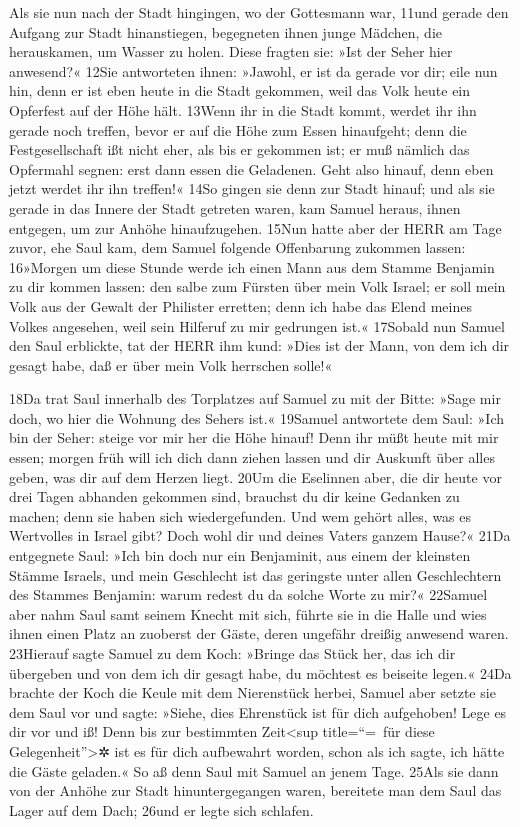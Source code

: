 Als sie nun nach der Stadt hingingen, wo der Gottesmann war, 11und
gerade den Aufgang zur Stadt hinanstiegen, begegneten ihnen junge
Mädchen, die herauskamen, um Wasser zu holen. Diese fragten sie: »Ist
der Seher hier anwesend?« 12Sie antworteten ihnen: »Jawohl, er ist da
gerade vor dir; eile nun hin, denn er ist eben heute in die Stadt
gekommen, weil das Volk heute ein Opferfest auf der Höhe hält. 13Wenn
ihr in die Stadt kommt, werdet ihr ihn gerade noch treffen, bevor er auf
die Höhe zum Essen hinaufgeht; denn die Festgesellschaft ißt nicht eher,
als bis er gekommen ist; er muß nämlich das Opfermahl segnen: erst dann
essen die Geladenen. Geht also hinauf, denn eben jetzt werdet ihr ihn
treffen!« 14So gingen sie denn zur Stadt hinauf; und als sie gerade in
das Innere der Stadt getreten waren, kam Samuel heraus, ihnen entgegen,
um zur Anhöhe hinaufzugehen. 15Nun hatte aber der HERR am Tage zuvor,
ehe Saul kam, dem Samuel folgende Offenbarung zukommen lassen: 16»Morgen
um diese Stunde werde ich einen Mann aus dem Stamme Benjamin zu dir
kommen lassen: den salbe zum Fürsten über mein Volk Israel; er soll mein
Volk aus der Gewalt der Philister erretten; denn ich habe das Elend
meines Volkes angesehen, weil sein Hilferuf zu mir gedrungen ist.«
17Sobald nun Samuel den Saul erblickte, tat der HERR ihm kund: »Dies ist
der Mann, von dem ich dir gesagt habe, daß er über mein Volk herrschen
solle!«

18Da trat Saul innerhalb des Torplatzes auf Samuel zu mit der Bitte:
»Sage mir doch, wo hier die Wohnung des Sehers ist.« 19Samuel antwortete
dem Saul: »Ich bin der Seher: steige vor mir her die Höhe hinauf! Denn
ihr müßt heute mit mir essen; morgen früh will ich dich dann ziehen
lassen und dir Auskunft über alles geben, was dir auf dem Herzen liegt.
20Um die Eselinnen aber, die dir heute vor drei Tagen abhanden gekommen
sind, brauchst du dir keine Gedanken zu machen; denn sie haben sich
wiedergefunden. Und wem gehört alles, was es Wertvolles in Israel gibt?
Doch wohl dir und deines Vaters ganzem Hause?« 21Da entgegnete Saul:
»Ich bin doch nur ein Benjaminit, aus einem der kleinsten Stämme
Israels, und mein Geschlecht ist das geringste unter allen Geschlechtern
des Stammes Benjamin: warum redest du da solche Worte zu mir?« 22Samuel
aber nahm Saul samt seinem Knecht mit sich, führte sie in die Halle und
wies ihnen einen Platz an zuoberst der Gäste, deren ungefähr dreißig
anwesend waren. 23Hierauf sagte Samuel zu dem Koch: »Bringe das Stück
her, das ich dir übergeben und von dem ich dir gesagt habe, du möchtest
es beiseite legen.« 24Da brachte der Koch die Keule mit dem Nierenstück
herbei, Samuel aber setzte sie dem Saul vor und sagte: »Siehe, dies
Ehrenstück ist für dich aufgehoben! Lege es dir vor und iß! Denn bis zur
bestimmten Zeit\textless sup title=``=~für diese
Gelegenheit''\textgreater✲ ist es für dich aufbewahrt worden, schon als
ich sagte, ich hätte die Gäste geladen.« So aß denn Saul mit Samuel an
jenem Tage. 25Als sie dann von der Anhöhe zur Stadt hinuntergegangen
waren, bereitete man dem Saul das Lager auf dem Dach; 26und er legte
sich schlafen.

